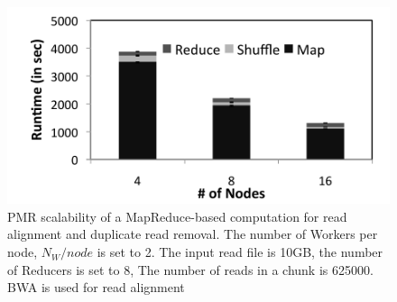 \documentclass{acm_proc_article-sp}
\begin{document}


\begin{figure}
 \centering
\includegraphics[scale=0.50]{figures/scale-up-bw.pdf} 
\caption{\small PMR scalability of a MapReduce-based computation for
  read alignment and duplicate read removal.  The number of Workers
  per node, $N_{W}/node$ is set to 2.  The input read file is 10GB,
  the number of Reducers is set to 8, The number of reads in a chunk
  is 625000. BWA is used for read alignment}

  \label{fig:scale-p-saga-mr} 
\end{figure}
\end{document}
